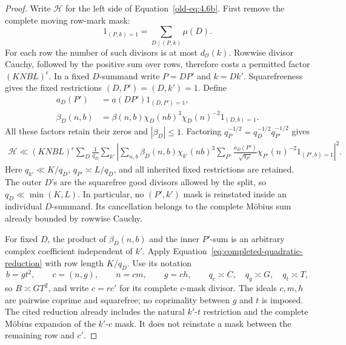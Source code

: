 \documentclass[11pt,a4paper]{article}
\numberwithin{equation}{section}
\numberwithin{figure}{section}
\theoremstyle{definition}
\theoremstyle{remark}
\begin{document}
\begin{proof}
Write \(\mathcal H\) for the left side of Equation~\eqref{old-eq:4.6b}.
First remove the complete moving row-mark mask:
\[
 1_{(P,k)=1}=\sum_{D\mid(P,k)}\mu(D).
\]
For each row the number of such divisors is at most \(d_{\mathcal O}(k)\).
Rowwise divisor Cauchy, followed by the positive sum over rows, therefore
costs a permitted factor \((KNBL)^\epsilon\).  In a fixed \(D\)-summand write
\(P=DP'\) and \(k=Dk'\).  Squarefreeness gives the fixed restrictions
\((D,P')=(D,k')=1\).  Define
\[
 \begin{split}
 a_D(P')&=a(DP')1_{(D,P')=1},\\
 \beta_D(n,b)&=\beta(n,b)\chi_D(nb)^3\chi_D(n)^{-2}1_{(D,b)=1}.
 \end{split}
\]
All these factors retain their zeros and \(|\beta_D|\le1\).  Factoring
\(q_P^{-1/2}=q_D^{-1/2}q_{P'}^{-1/2}\) gives
\begin{equation}\label{eq:hybrid-mark-mask-reduction}
 \begin{split}
 \mathcal H\ll (KNBL)^\epsilon\sum_D\frac1{q_D}
 \sum_{k'}\left|
 \sum_{n,b}\beta_D(n,b)\chi_{k'}(nb)^3
 \sum_{P'}\frac{a_D(P')}{\sqrt{q_{P'}}}
       \chi_{P'}(n)^{-2}1_{(P',b)=1}
 \right|^2.
 \end{split}
\end{equation}
Here \(q_{k'}\ll K/q_D\), \(q_{P'}\asymp L/q_D\), and all inherited fixed
restrictions are retained.  The outer \(D\)'s are the squarefree good divisors
allowed by the split, so \(q_D\ll\min(K,L)\).  In particular, no \((P',k')\) mask is reinstated
inside an individual \(D\)-summand.  Its cancellation belongs to the complete
M\"obius sum already bounded by rowwise Cauchy.

For fixed \(D\), the product of \(\beta_D(n,b)\) and the inner \(P'\)-sum
is an arbitrary complex coefficient independent of \(k'\).  Apply
Equation~\eqref{eq:completed-quadratic-reduction} with row length \(K/q_D\).
Use its notation
\[
 b=gt^2,\qquad c=(n,g),\qquad n=cm,\qquad g=ch,
 \qquad q_c\asymp C,\quad q_g\asymp G,\quad q_t\asymp T,
\]
so \(B\asymp GT^2\), and write \(c=rc'\) for its complete \(c\)-mask
divisor.  The ideals \(c,m,h\) are pairwise coprime and squarefree; no
coprimality between \(g\) and \(t\) is imposed.  The cited reduction already
includes the natural \(k'\)-\(t\) restriction and the complete M\"obius
expansion of the \(k'\)-\(c\) mask.  It does not reinstate a mask between
the remaining row and \(c'\).


\end{proof}
\end{document}
